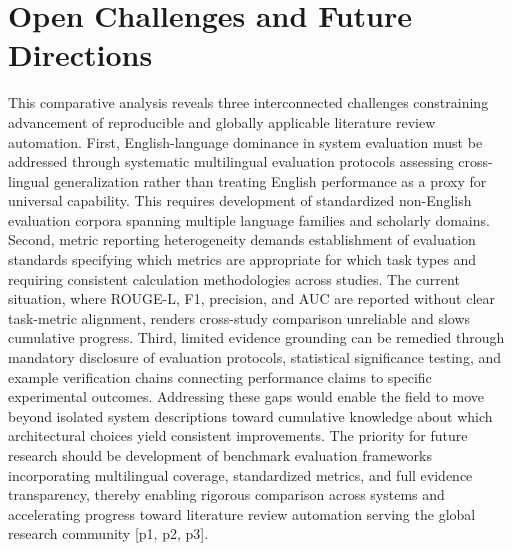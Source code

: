 \documentclass{article}
\begin{document}
\section{Open Challenges and Future Directions}
This comparative analysis reveals three interconnected challenges constraining advancement of reproducible and globally applicable literature review automation. First, English-language dominance in system evaluation must be addressed through systematic multilingual evaluation protocols assessing cross-lingual generalization rather than treating English performance as a proxy for universal capability. This requires development of standardized non-English evaluation corpora spanning multiple language families and scholarly domains. Second, metric reporting heterogeneity demands establishment of evaluation standards specifying which metrics are appropriate for which task types and requiring consistent calculation methodologies across studies. The current situation, where ROUGE-L, F1, precision, and AUC are reported without clear task-metric alignment, renders cross-study comparison unreliable and slows cumulative progress. Third, limited evidence grounding can be remedied through mandatory disclosure of evaluation protocols, statistical significance testing, and example verification chains connecting performance claims to specific experimental outcomes. Addressing these gaps would enable the field to move beyond isolated system descriptions toward cumulative knowledge about which architectural choices yield consistent improvements. The priority for future research should be development of benchmark evaluation frameworks incorporating multilingual coverage, standardized metrics, and full evidence transparency, thereby enabling rigorous comparison across systems and accelerating progress toward literature review automation serving the global research community [p1, p2, p3].
\end{document}

